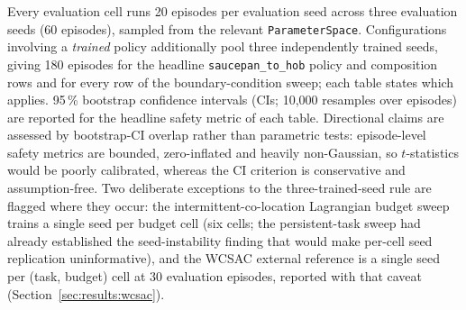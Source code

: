 \documentclass[11pt,a4paper]{report}
\begin{document}
\begin{table}[htbp]
\centering
\small
\caption{Experiment overview used by the results chapter.}
\label{tab:experiment-overview}
\end{table}

Every evaluation cell runs 20 episodes per evaluation seed across
three evaluation seeds (60 episodes), sampled from the relevant
\texttt{ParameterSpace}. Configurations involving a \emph{trained}
policy additionally pool three independently trained seeds, giving
180 episodes for the headline \texttt{saucepan\_to\_hob} policy and composition rows
and for every row of the boundary-condition sweep; each table states
which applies. 95\,\% bootstrap confidence intervals (CIs; 10{,}000
resamples over episodes) are reported for the headline safety
metric of each table. Directional claims are assessed by
bootstrap-CI overlap rather than parametric tests: episode-level
safety metrics are bounded, zero-inflated and heavily non-Gaussian,
so $t$-statistics would be poorly calibrated, whereas the CI
criterion is conservative and assumption-free. Two deliberate
exceptions to the three-trained-seed rule are flagged where they
occur: the intermittent-co-location Lagrangian budget sweep trains a
single seed per budget cell (six cells; the persistent-task sweep had already
established the seed-instability finding that would make per-cell
seed replication uninformative), and the WCSAC external reference is
a single seed per (task, budget) cell at 30 evaluation episodes,
reported with that caveat (Section~\ref{sec:results:wcsac}).
\end{document}
